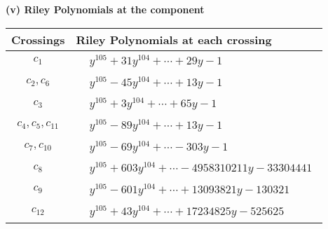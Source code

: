 \documentclass[1p]{elsarticle_modified}
\theoremstyle{definition}
\begin{document}
\newpage\renewcommand{\arraystretch}{1}
\flushleft \textbf{(v) Riley Polynomials at the component}\newline \\
\begin{tabular}{m{50pt}|m{274pt}}
Crossings & \hspace{64pt}Riley Polynomials at each crossing \\
\hline $$\begin{aligned}c_{1}\end{aligned}$$&$\begin{aligned}
&y^{105}+31 y^{104}+\cdots+29 y-1
\end{aligned}$\\
\hline $$\begin{aligned}c_{2},c_{6}\end{aligned}$$&$\begin{aligned}
&y^{105}-45 y^{104}+\cdots+13 y-1
\end{aligned}$\\
\hline $$\begin{aligned}c_{3}\end{aligned}$$&$\begin{aligned}
&y^{105}+3 y^{104}+\cdots+65 y-1
\end{aligned}$\\
\hline $$\begin{aligned}c_{4},c_{5},c_{11}\end{aligned}$$&$\begin{aligned}
&y^{105}-89 y^{104}+\cdots+13 y-1
\end{aligned}$\\
\hline $$\begin{aligned}c_{7},c_{10}\end{aligned}$$&$\begin{aligned}
&y^{105}-69 y^{104}+\cdots-303 y-1
\end{aligned}$\\
\hline $$\begin{aligned}c_{8}\end{aligned}$$&$\begin{aligned}
&y^{105}+603 y^{104}+\cdots-4958310211 y-33304441
\end{aligned}$\\
\hline $$\begin{aligned}c_{9}\end{aligned}$$&$\begin{aligned}
&y^{105}-601 y^{104}+\cdots+13093821 y-130321
\end{aligned}$\\
\hline $$\begin{aligned}c_{12}\end{aligned}$$&$\begin{aligned}
&y^{105}+43 y^{104}+\cdots+17234825 y-525625
\end{aligned}$\\
\hline
\end{tabular}\\~\\
\end{document}
